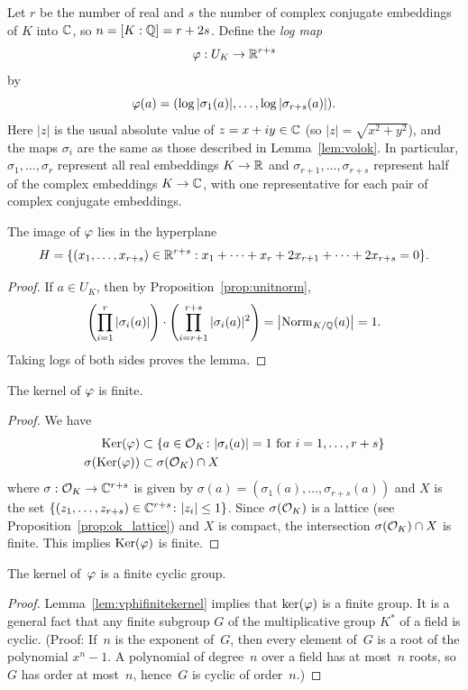 Let $r$ be the number of real and $s$ the number of complex conjugate
embeddings of $K$ into $\mathbb{C}$, so $n=[K:\mathbb{Q}]=r+2s$.
Define the {\em log map}
$$
\varphi:U_K \to \mathbb{R}^{r+s}
$$
by
$$
 \varphi(a) = (\log|\sigma_1(a)|,\ldots, \log|\sigma_{r+s}(a)|).
$$
Here $|z|$ is the usual absolute value of $z=x+iy\in\mathbb{C}$
(so $|z|=\sqrt{x^2+y^2}$), and the maps $\sigma_i$ are
the same as those described in Lemma~\ref{lem:volok}.
In particular,
$\sigma_1,\dots,\sigma_r$ represent all real embeddings
$K\to\mathbb{R}$ and $\sigma_{r+1},\dots,\sigma_{r+s}$ represent
half of the complex embeddings $K\to\mathbb{C}$, with one representative
for each pair of complex conjugate embeddings.

\begin{lemma}\label{lem:inh}
The image of $\varphi$ lies in the hyperplane
\begin{equation}\label{eqn:hyperplane}
H = \{(x_1,\ldots, x_{r+s})\in\mathbb{R}^{r+s} :
  x_1+ \cdots + x_r + 2x_{r+1} + \cdots + 2x_{r+s} = 0\}.
\end{equation}
\end{lemma}
\begin{proof}
If $a\in U_K$, then
by Proposition~\ref{prop:unitnorm},
$$\left(\prod_{i=1}^{r} |\sigma_i(a)|\right)
  \cdot \left( \prod_{i=r+1}^{r+s} |\sigma_i(a)|^2 \right) =
\left|\operatorname{Norm}_{K/\mathbb{Q}}(a)\right| = 1.$$
Taking logs of both sides proves the lemma.
\end{proof}

\begin{lemma}\label{lem:vphifinitekernel}
The kernel of $\varphi$ is finite.
\end{lemma}
\begin{proof}
We have
\begin{align*}
  \operatorname{Ker}(\varphi) &\subset \{a\in\mathcal{O}_K \colon |\sigma_i(a)| = 1 \text{ for }i=1,\ldots,r+s\}
  \\
  \sigma(\operatorname{Ker}(\varphi)) &\subset \sigma(\mathcal{O}_K) \cap X
\end{align*}
where $\sigma:\mathcal{O}_K \to \mathbb{C}^{r+s}$ is given by
$\sigma(a) = \left(\sigma_1(a),\dots,\sigma_{r+s}(a)\right)$ and
$X$ is the set $\left\{(z_1,\dots,z_{r+s})\in\mathbb{C}^{r+s} \colon |z_i|\leq 1\right\}$.
Since $\sigma(\mathcal{O}_K)$ is a lattice (see Proposition~\ref{prop:ok_lattice})
and $X$ is compact, the intersection $\sigma(\mathcal{O}_K)\cap X$ is finite.
This implies $\operatorname{Ker}(\varphi)$ is finite.
\end{proof}

\begin{lemma}\label{lem:kerfcg}
The kernel of~$\varphi$ is a finite cyclic group.
\end{lemma}
\begin{proof}
  Lemma~\ref{lem:vphifinitekernel} implies that $\ker(\varphi)$ is a
  finite group.  It is a general fact that any finite subgroup $G$ of
  the multiplicative group $K^*$ of a field is cyclic.  (Proof: If~$n$
  is the exponent of~$G$, then every element of~$G$ is a root of the
  polynomial $x^n-1$.  A polynomial of degree~$n$ over a field has at
  most~$n$ roots, so $G$ has order at most~$n$, hence~$G$ is cyclic of
  order~$n$.) %
\end{proof}

